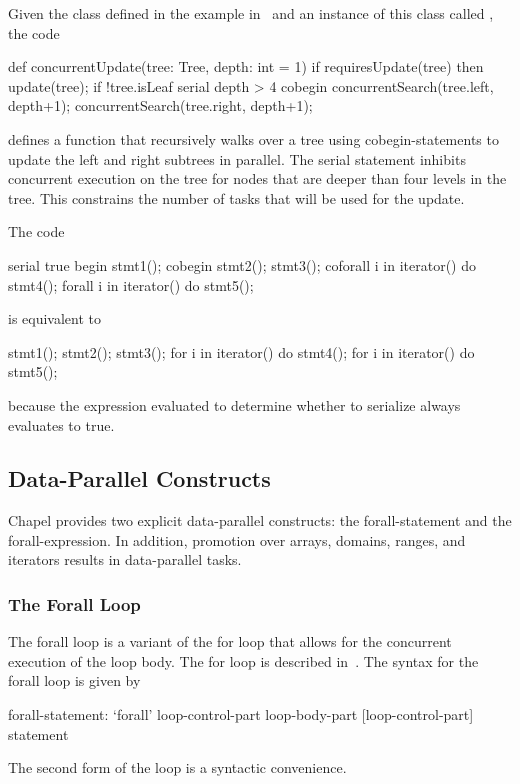 \begin{example}
Given the  class defined in the example
in~ and an instance of this class
called , the code
\begin{chapel}
def concurrentUpdate(tree: Tree, depth: int = 1) {
  if requiresUpdate(tree) then
    update(tree);
  if !tree.isLeaf {
    serial depth > 4 cobegin {
      concurrentSearch(tree.left, depth+1);
      concurrentSearch(tree.right, depth+1);
    }
  }
}
\end{chapel}
defines a function  that recursively walks over
a tree using cobegin-statements to update the left and right subtrees
in parallel.  The serial statement inhibits concurrent execution on
the tree for nodes that are deeper than four levels in the tree.  This
constrains the number of tasks that will be used for the update.
\end{example}

\begin{example}
The code
\begin{chapel}
serial true {
  begin stmt1();
  cobegin {
    stmt2();
    stmt3();
  }
  coforall i in iterator() do stmt4();
  forall i in iterator() do stmt5();
}
\end{chapel}
is equivalent to
\begin{chapel}
stmt1();
{
  stmt2();
  stmt3();
}
for i in iterator() do stmt4();
for i in iterator() do stmt5();
\end{chapel}
because the expression evaluated to determine whether to serialize
always evaluates to true.
\end{example}

\subsection{Data-Parallel Constructs}
\label{data_parallelism}

Chapel provides two explicit data-parallel constructs: the
forall-statement and the forall-expression.  In addition, promotion
over arrays, domains, ranges, and iterators results in data-parallel
tasks.

\subsubsection{The Forall Loop}
\label{Forall}

The forall loop is a variant of the for loop that allows for the
concurrent execution of the loop body. The for loop is described
in~. The syntax for the forall loop is given by
\begin{syntax}
forall-statement:
  `forall' loop-control-part loop-body-part
  [loop-control-part] statement
\end{syntax}
The second form of the loop is a syntactic convenience.

